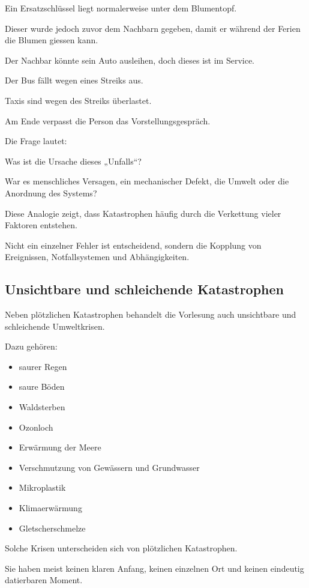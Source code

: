 Ein Ersatzschlüssel liegt normalerweise
unter dem Blumentopf.

Dieser wurde jedoch zuvor
dem Nachbarn gegeben,
damit er während der Ferien
die Blumen giessen kann.

Der Nachbar könnte sein Auto ausleihen,
doch dieses ist im Service.

Der Bus fällt wegen eines Streiks aus.

Taxis sind wegen des Streiks überlastet.

Am Ende verpasst die Person
das Vorstellungsgespräch.

Die Frage lautet:

Was ist die Ursache dieses „Unfalls“?

War es menschliches Versagen,
ein mechanischer Defekt,
die Umwelt
oder die Anordnung des Systems?

Diese Analogie zeigt,
dass Katastrophen häufig
durch die Verkettung vieler Faktoren entstehen.

Nicht ein einzelner Fehler ist entscheidend,
sondern die Kopplung von Ereignissen,
Notfallsystemen
und Abhängigkeiten.

\subsection{Unsichtbare und schleichende Katastrophen}

Neben plötzlichen Katastrophen
behandelt die Vorlesung auch
unsichtbare und schleichende Umweltkrisen.

Dazu gehören:

\begin{itemize}
\item saurer Regen
\item saure Böden
\item Waldsterben
\item Ozonloch
\item Erwärmung der Meere
\item Verschmutzung von Gewässern und Grundwasser
\item Mikroplastik
\item Klimaerwärmung
\item Gletscherschmelze
\end{itemize}

Solche Krisen unterscheiden sich
von plötzlichen Katastrophen.

Sie haben meist keinen klaren Anfang,
keinen einzelnen Ort
und keinen eindeutig datierbaren Moment.

